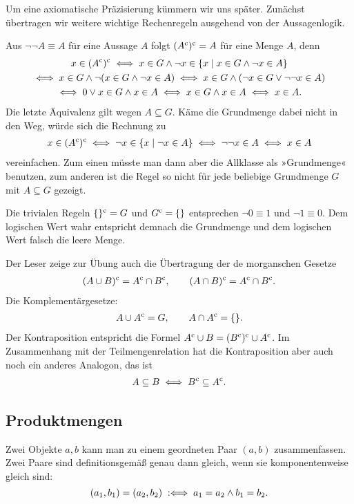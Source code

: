 Um eine axiomatische Präzisierung kümmern wir uns später.
Zunächst übertragen wir weitere wichtige Rechenregeln ausgehend
von der Aussagenlogik.

Aus $\neg\neg A\equiv A$ für eine Aussage $A$ folgt
$(A^\mathrm c)^\mathrm c = A$ für eine Menge $A$, denn
\begin{gather*}
x\in (A^\mathrm c)^\mathrm c \iff x\in G\land \neg x\in\{x\mid x\in G\land \neg x\in A\}\\
\iff x\in G\land \neg (x\in G\land \neg x\in A)
\iff x\in G\land (\neg x\in G\lor \neg\neg x\in A)\\
\iff 0\lor x\in G\land x\in A
\iff x\in G\land x\in A
\iff x\in A.
\end{gather*}
Die letzte Äquivalenz gilt wegen $A\subseteq G$. Käme die Grundmenge
dabei nicht in den Weg, würde sich die Rechnung zu
\begin{gather*}
x\in (A^\mathrm c)^\mathrm c \iff \neg x\in\{x\mid \neg x\in A\}
\iff \neg\neg x\in A\iff x\in A
\end{gather*}
vereinfachen. Zum einen müsste man dann aber
die Allklasse als »Grundmenge« benutzen, zum anderen ist die Regel
so nicht für jede beliebige Grundmenge $G$ mit $A\subseteq G$
gezeigt.

Die trivialen Regeln $\{\}^\mathrm c = G$ und $G^\mathrm c=\{\}$
entsprechen $\neg 0\equiv 1$ und $\neg 1\equiv 0$.
Dem logischen Wert wahr entspricht demnach die Grundmenge
und dem logischen Wert falsch die leere Menge.

Der Leser zeige zur Übung auch die Übertragung der de morganschen
Gesetze
\begin{gather*}
(A\cup B)^\mathrm c = A^\mathrm c\cap B^\mathrm c,\qquad
(A\cap B)^\mathrm c = A^\mathrm c\cap B^\mathrm c.
\end{gather*}
Die Komplementärgesetze:
\begin{gather*}
A\cup A^\mathrm c = G,\qquad A\cap A^\mathrm c = \{\}.
\end{gather*}
Der Kontraposition entspricht die Formel
$A^\mathrm c\cup B=(B^\mathrm c)^\mathrm c\cup A^\mathrm c$. Im Zusammenhang
mit der Teilmengenrelation hat die Kontraposition aber auch noch
ein anderes Analogon, das ist%
\begin{gather*}
A\subseteq B \iff B^\mathrm c\subseteq A^\mathrm c.
\end{gather*}


\newpage
\subsection{Produktmengen}
Zwei Objekte $a,b$ kann man zu einem geordneten Paar $(a,b)$
zusammenfassen. Zwei Paare sind definitionsgemäß genau dann
gleich, wenn sie komponentenweise gleich sind:
\[(a_1,b_1) = (a_2,b_2) \;:\Longleftrightarrow\; a_1=a_2\land b_1=b_2.\]

